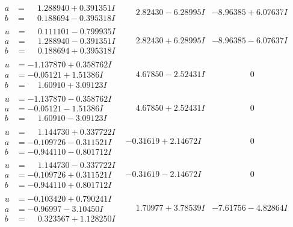 \documentclass[1p]{elsarticle_modified}
\theoremstyle{definition}
\begin{document}
$$\begin{array}{c|c|c}
\begin{aligned}
a &= \phantom{-}1.288940 + 0.391351 I \\
b &= \phantom{-}0.188694 - 0.395318 I\end{aligned}
 & \phantom{-}2.82430 - 6.28995 I & -8.96385 + 6.07637 I \\ \hline\begin{aligned}
u &= \phantom{-}0.111101 - 0.799935 I \\
a &= \phantom{-}1.288940 - 0.391351 I \\
b &= \phantom{-}0.188694 + 0.395318 I\end{aligned}
 & \phantom{-}2.82430 + 6.28995 I & -8.96385 - 6.07637 I \\ \hline\begin{aligned}
u &= -1.137870 + 0.358762 I \\
a &= -0.05121 + 1.51386 I \\
b &= \phantom{-}1.60910 + 3.09123 I\end{aligned}
 & \phantom{-}4.67850 - 2.52431 I & \phantom{-0.000000 } 0 \\ \hline\begin{aligned}
u &= -1.137870 - 0.358762 I \\
a &= -0.05121 - 1.51386 I \\
b &= \phantom{-}1.60910 - 3.09123 I\end{aligned}
 & \phantom{-}4.67850 + 2.52431 I & \phantom{-0.000000 } 0 \\ \hline\begin{aligned}
u &= \phantom{-}1.144730 + 0.337722 I \\
a &= -0.109726 - 0.311521 I \\
b &= -0.944110 - 0.801712 I\end{aligned}
 & -0.31619 + 2.14672 I & \phantom{-0.000000 } 0 \\ \hline\begin{aligned}
u &= \phantom{-}1.144730 - 0.337722 I \\
a &= -0.109726 + 0.311521 I \\
b &= -0.944110 + 0.801712 I\end{aligned}
 & -0.31619 - 2.14672 I & \phantom{-0.000000 } 0 \\ \hline\begin{aligned}
u &= -0.103420 + 0.790241 I \\
a &= -0.96997 - 3.10450 I \\
b &= \phantom{-}0.323567 + 1.128250 I\end{aligned}
 & \phantom{-}1.70977 + 3.78539 I & -7.61756 - 4.82864 I \\ \hline\begin{aligned}

\end{aligned}
\end{array}$$
\end{document}
